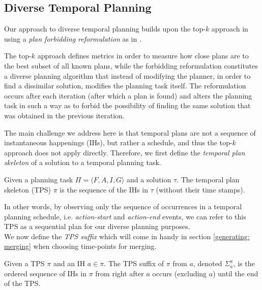 \subsection{Diverse Temporal Planning}
\label{background: Diverse Temporal}

Our approach to diverse temporal planning builds upon the top-$k$ approach in \cite{katz2019reshaping} using a {\em plan forbidding reformulation} as in \cite{katz2018novel} . 

The top-$k$ approach defines metrics in order to measure how close plans are to the best subset of all known plans, while the forbidding reformulation constitutes a diverse planning algorithm that instead of modifying the planner, in order to find a dissimilar solution, modifies the planning task itself. The reformulation occurs after each iteration (after which a plan is found) and alters the planning task in such a way as to forbid the possibility of finding the same solution that was obtained in the previous iteration.

The main challenge we address here is that temporal plans are not a sequence of instantaneous happenings (IHs), but rather a schedule, and thus the top-$k$ approach does not apply directly. Therefore, we first define the {\em temporal plan skeleton} of a solution to a temporal planning task.

\begin{definition}
Given a planning task $\Pi = \langle F,A,I,G \rangle$ and a solution $\tau$. 
The temporal plan skeleton (TPS) $\pi$ is the sequence of the IHs in $\tau$ (without their time stamps).
\end{definition}

In other words, by observing only the sequence of occurrences in a temporal planning schedule, i.e. \textit{action-start} and \textit{action-end} events, we can refer to this TPS as a sequential plan for our diverse planning purposes. \\
We now define the \textit{TPS suffix} which will come in handy in section \ref{generating: merging} when choosing time-points for merging.

\begin{definition}
Given a TPS $\pi$ and an IH $a \in \pi$. The TPS suffix of $\pi$ from $a$, denoted $\Sigma^\pi_a$, is the ordered sequence of IHs in $\pi$ from right after $a$ occurs (excluding $a$) until the end of the TPS.
\end{definition}



